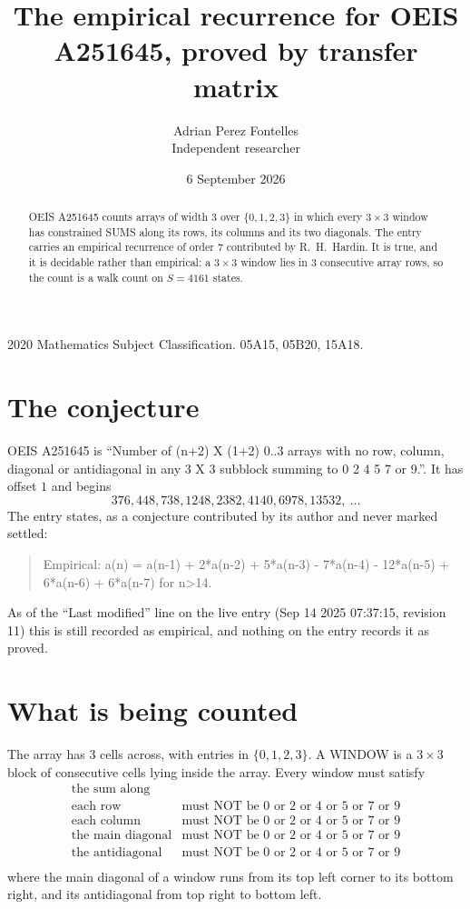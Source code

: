 \documentclass[11pt,a4paper]{article}
\title{The empirical recurrence for OEIS A251645, proved by transfer matrix}
\author{Adrian Perez Fontelles\\ \small Independent researcher}
\date{6 September 2026}
\theoremstyle{plain}
\theoremstyle{definition}
\begin{document}
\maketitle

\begin{abstract}
OEIS A251645 counts arrays of width $3$ over $\{0,1,2,3\}$ in which every $3\times3$ window has
constrained SUMS along its rows, its columns and its two diagonals. The entry carries an
empirical recurrence of order $7$ contributed by R.~H.~Hardin. It is true, and it is
decidable rather than empirical: a $3\times3$ window lies in $3$ consecutive array rows,
so the count is a walk count on $S=4161$ states.
\end{abstract}

\noindent\small 2020 Mathematics Subject Classification. 05A15, 05B20, 15A18.\normalsize

\section{The conjecture}

OEIS A251645 is ``Number of (n+2) X (1+2) 0..3 arrays with no row, column, diagonal or antidiagonal in any 3 X 3 subblock summing to 0 2 4 5 7 or 9.''. It has offset $1$ and begins
\[
376, 448, 738, 1248, 2382, 4140, 6978, 13532,\ \dots
\]
The entry states, as a conjecture contributed by its author and never marked settled:
\begin{quote}
Empirical: a(n) = a(n-1) + 2*a(n-2) + 5*a(n-3) - 7*a(n-4) - 12*a(n-5) + 6*a(n-6) + 6*a(n-7) for n>14.
\end{quote}
As of the ``Last modified'' line on the live entry (Sep 14 2025 07:37:15, revision 11) this is still
recorded as empirical, and nothing on the entry records it as proved.

\section{What is being counted}

The array has $3$ cells across, with entries in $\{0,1,2,3\}$. A WINDOW is a $3\times3$ block
of consecutive cells lying inside the array. Every window must satisfy
\[
\begin{array}{ll}
\text{the sum along} & \text{} \\[2pt]
\text{each row} & \text{must NOT be 0 or 2 or 4 or 5 or 7 or 9} \\
\text{each column} & \text{must NOT be 0 or 2 or 4 or 5 or 7 or 9} \\
\text{the main diagonal} & \text{must NOT be 0 or 2 or 4 or 5 or 7 or 9} \\
\text{the antidiagonal} & \text{must NOT be 0 or 2 or 4 or 5 or 7 or 9} \\
\end{array}
\]
where the main diagonal of a window runs from its top left corner to its bottom right, and its
antidiagonal from top right to bottom left.
\end{document}
